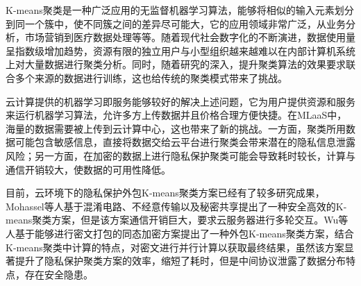 %
%
%

K-means聚类是一种广泛应用的无监督机器学习算法，能够将相似的输入元素划分到同一个簇中，使不同簇之间的差异尽可能大，它的应用领域非常广泛，从业务分析，市场营销到医疗数据处理等等。随着现代社会数字化的不断演进，数据使用量呈指数级增加趋势，资源有限的独立用户与小型组织越来越难以在内部计算机系统上对大量数据进行聚类分析。同时，随着研究的深入，提升聚类算法的效果要求联合多个来源的数据进行训练，这也给传统的聚类模式带来了挑战。

云计算提供的机器学习即服务能够较好的解决上述问题，它为用户提供资源和服务来运行机器学习算法，允许多方上传数据并且价格合理方便快捷\cite{ribeiro2015mlaas}。在MLaaS中，海量的数据需要被上传到云计算中心，这也带来了新的挑战。一方面，聚类所用数据可能包含敏感信息，直接将数据交给云平台进行聚类会带来潜在的隐私信息泄露风险；另一方面，在加密的数据上进行隐私保护聚类可能会导致耗时较长，计算与通信开销较大，使数据的可用性降低。

目前，云环境下的隐私保护外包K-means聚类方案已经有了较多研究成果\cite{mohassel2019practical,wu2020secure,rong2017privacy,jaschke2019unsupervised}，Mohassel等人\cite{mohassel2019practical}基于混淆电路、不经意传输以及秘密共享提出了一种安全高效的K-means聚类方案，但是该方案通信开销巨大，要求云服务器进行多轮交互。Wu等人\cite{wu2020secure}基于能够进行密文打包的同态加密方案提出了一种外包K-means聚类方案，结合K-means聚类中计算的特点，对密文进行并行计算以获取最终结果，虽然该方案显著提升了隐私保护聚类方案的效率，缩短了耗时，但是中间协议泄露了数据分布特点，存在安全隐患。

